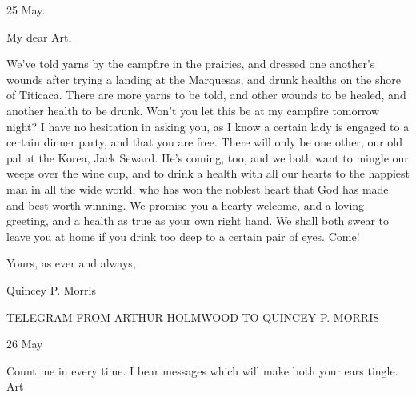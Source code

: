 25 May. 

My dear Art, 

We've told yarns by the campfire in the prairies, and dressed one another's wounds after trying a landing at the Marquesas, and drunk healths on the shore of Titicaca. There are more yarns to be told, and other wounds to be healed, and another health to be drunk. Won't you let this be at my campfire tomorrow night? I have no hesitation in asking you, as I know a certain lady is engaged to a certain dinner party, and that you are free. There will only be one other, our old pal at the Korea, Jack Seward. He's coming, too, and we both want to mingle our weeps over the wine cup, and to drink a health with all our hearts to the happiest man in all the wide world, who has won the noblest heart that God has made and best worth winning. We promise you a hearty welcome, and a loving greeting, and a health as true as your own right hand. We shall both swear to leave you at home if you drink too deep to a certain pair of eyes. Come! 

Yours, as ever and always, 

Quincey P. Morris 

TELEGRAM FROM ARTHUR HOLMWOOD TO QUINCEY P. MORRIS 

26 May 

Count me in every time. I bear messages which will make both your ears tingle. Art 

